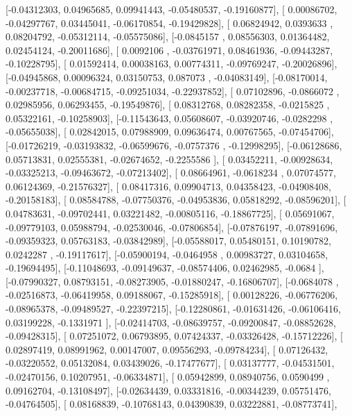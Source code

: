 \documentclass{article}
\begin{document}
       [-0.04312303,  0.04965685,  0.09941443, -0.05480537, -0.19160877],
       [ 0.00086702, -0.04297767,  0.03445041, -0.06170854, -0.19429828],
       [ 0.06824942,  0.0393633 ,  0.08204792, -0.05312114, -0.05575086],
       [-0.0845157 ,  0.08556303,  0.01364482,  0.02454124, -0.20011686],
       [ 0.0092106 , -0.03761971,  0.08461936, -0.09443287, -0.10228795],
       [ 0.01592414,  0.00038163,  0.00774311, -0.09769247, -0.20026896],
       [-0.04945868,  0.00096324,  0.03150753,  0.087073  , -0.04083149],
       [-0.08170014, -0.00237718, -0.00684715, -0.09251034, -0.22937852],
       [ 0.07102896, -0.0866072 ,  0.02985956,  0.06293455, -0.19549876],
       [ 0.08312768,  0.08282358, -0.0215825 ,  0.05322161, -0.10258903],
       [-0.11543643,  0.05608607, -0.03920746, -0.0282298 , -0.05655038],
       [ 0.02842015,  0.07988909,  0.09636474,  0.00767565, -0.07454706],
       [-0.01726219, -0.03193832, -0.06599676, -0.0757376 , -0.12998295],
       [-0.06128686,  0.05713831,  0.02555381, -0.02674652, -0.2255586 ],
       [ 0.03452211, -0.00928634, -0.03325213, -0.09463672, -0.07213402],
       [ 0.08664961, -0.0618234 ,  0.07074577,  0.06124369, -0.21576327],
       [ 0.08417316,  0.09904713,  0.04358423, -0.04908408, -0.20158183],
       [ 0.08584788, -0.07750376, -0.04953836,  0.05818292, -0.08596201],
       [ 0.04783631, -0.09702441,  0.03221482, -0.00805116, -0.18867725],
       [ 0.05691067, -0.09779103,  0.05988794, -0.02530046, -0.07806854],
       [-0.07876197, -0.07891696, -0.09359323,  0.05763183, -0.03842989],
       [-0.05588017,  0.05480151,  0.10190782,  0.0242287 , -0.19117617],
       [-0.05900194, -0.0464958 ,  0.00983727,  0.03104658, -0.19694495],
       [-0.11048693, -0.09149637, -0.08574406,  0.02462985, -0.0684    ],
       [-0.07990327,  0.08793151, -0.08273905, -0.01880247, -0.16806707],
       [-0.0684078 , -0.02516873, -0.06419958,  0.09188067, -0.15285918],
       [ 0.00128226, -0.06776206, -0.08965378, -0.09489527, -0.22397215],
       [-0.12280861, -0.01631426, -0.06106416,  0.03199228, -0.1331971 ],
       [-0.02414703, -0.08639757, -0.09200847, -0.08852628, -0.09428315],
       [ 0.07251072,  0.06793895,  0.07424337, -0.03326428, -0.15712226],
       [ 0.02897419,  0.08991962,  0.00147007,  0.09556293, -0.09784234],
       [ 0.07126432, -0.03220552,  0.05132084,  0.03439026, -0.17477677],
       [ 0.03137777, -0.04531501, -0.02470156,  0.10207951, -0.06334871],
       [ 0.05942899,  0.08940756,  0.0590499 ,  0.09162704, -0.13108497],
       [-0.02634439,  0.03331816, -0.00344239,  0.05751476, -0.04764505],
       [ 0.08168839, -0.10768143,  0.04390839,  0.03222881, -0.08773741],
\end{document}
